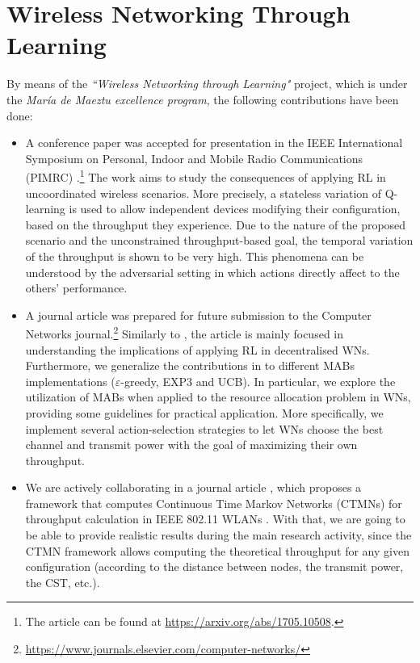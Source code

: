\documentclass[12pt, a4paper,twoside]{tesi_upf}
\begin{document}
		\section{Wireless Networking Through Learning}
		\label{section:mdm}		
			By means of the \textit{``Wireless Networking through Learning"} project, which is under the \textit{Mar\'ia de Maeztu excellence program}, the following contributions have been done:
			\begin{itemize}
				\item A conference paper was accepted for presentation in the IEEE International Symposium on Personal, Indoor and Mobile Radio Communications (PIMRC) \cite{wilhelmi2017implications}.\footnote{The article can be found at \url{https://arxiv.org/abs/1705.10508}.} The work aims to study the consequences of applying RL in uncoordinated wireless scenarios. More precisely, a stateless variation of Q-learning is used to allow independent devices modifying their configuration, based on the throughput they experience. Due to the nature of the proposed scenario and the unconstrained throughput-based goal, the temporal variation of the throughput is shown to be very high. This phenomena can be understood by the adversarial setting in which actions directly affect to the others' performance. 
				\item A journal article \cite{wilhelmi2017enhancing} was prepared for future submission to the Computer Networks journal.\footnote{\url{https://www.journals.elsevier.com/computer-networks/}} Similarly to \cite{wilhelmi2017implications}, the article is mainly focused in understanding the implications of applying RL in decentralised WNs. Furthermore, we generalize the contributions in \cite{wilhelmi2017implications} to different MABs implementations ($\varepsilon$-greedy, EXP3 and UCB). In particular, we explore the utilization of MABs when applied to the resource allocation problem in WNs, providing some guidelines for practical application. More specifically, we implement several action-selection strategies to let WNs choose the best channel and transmit power with the goal of maximizing their own throughput. 
				\item We are actively collaborating in a journal article \cite{barrachina2017ctmn}, which proposes a framework that computes Continuous Time Markov Networks (CTMNs) for throughput calculation in IEEE 802.11 WLANs \cite{bellalta2014throughput}. With that, we are going to be able to provide realistic results during the main research activity, since the CTMN framework allows computing the theoretical throughput for any given configuration (according to the distance between nodes, the transmit power, the CST, etc.).

\end{itemize}
\end{document}
